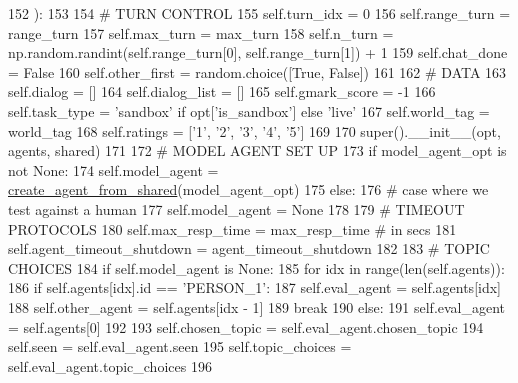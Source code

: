 \begin{DoxyCode}
152     ):
153 
154         \textcolor{comment}{# TURN CONTROL}
155         self.turn\_idx = 0
156         self.range\_turn = range\_turn
157         self.max\_turn = max\_turn
158         self.n\_turn = np.random.randint(self.range\_turn[0], self.range\_turn[1]) + 1
159         self.chat\_done = \textcolor{keyword}{False}
160         self.other\_first = random.choice([\textcolor{keyword}{True}, \textcolor{keyword}{False}])
161 
162         \textcolor{comment}{# DATA}
163         self.dialog = []
164         self.dialog\_list = []
165         self.gmark\_score = -1
166         self.task\_type = \textcolor{stringliteral}{'sandbox'} \textcolor{keywordflow}{if} opt[\textcolor{stringliteral}{'is\_sandbox'}] \textcolor{keywordflow}{else} \textcolor{stringliteral}{'live'}
167         self.world\_tag = world\_tag
168         self.ratings = [\textcolor{stringliteral}{'1'}, \textcolor{stringliteral}{'2'}, \textcolor{stringliteral}{'3'}, \textcolor{stringliteral}{'4'}, \textcolor{stringliteral}{'5'}]
169 
170         super().\_\_init\_\_(opt, agents, shared)
171 
172         \textcolor{comment}{# MODEL AGENT SET UP}
173         \textcolor{keywordflow}{if} model\_agent\_opt \textcolor{keywordflow}{is} \textcolor{keywordflow}{not} \textcolor{keywordtype}{None}:
174             self.model\_agent = \hyperlink{namespaceparlai_1_1core_1_1agents_aa5af5dd1d2f9da491b60348d479b849f}{create\_agent\_from\_shared}(model\_agent\_opt)
175         \textcolor{keywordflow}{else}:
176             \textcolor{comment}{# case where we test against a human}
177             self.model\_agent = \textcolor{keywordtype}{None}
178 
179         \textcolor{comment}{# TIMEOUT PROTOCOLS}
180         self.max\_resp\_time = max\_resp\_time  \textcolor{comment}{# in secs}
181         self.agent\_timeout\_shutdown = agent\_timeout\_shutdown
182 
183         \textcolor{comment}{# TOPIC CHOICES}
184         \textcolor{keywordflow}{if} self.model\_agent \textcolor{keywordflow}{is} \textcolor{keywordtype}{None}:
185             \textcolor{keywordflow}{for} idx \textcolor{keywordflow}{in} range(len(self.agents)):
186                 \textcolor{keywordflow}{if} self.agents[idx].id == \textcolor{stringliteral}{'PERSON\_1'}:
187                     self.eval\_agent = self.agents[idx]
188                     self.other\_agent = self.agents[idx - 1]
189                     \textcolor{keywordflow}{break}
190         \textcolor{keywordflow}{else}:
191             self.eval\_agent = self.agents[0]
192 
193         self.chosen\_topic = self.eval\_agent.chosen\_topic
194         self.seen = self.eval\_agent.seen
195         self.topic\_choices = self.eval\_agent.topic\_choices
196 
\end{DoxyCode}


